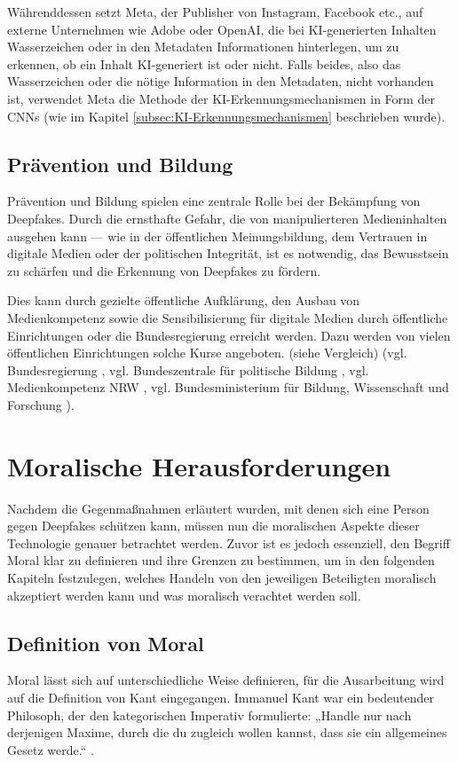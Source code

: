 \documentclass[a4paper,12pt]{article}
\begin{document}
Währenddessen setzt Meta, der Publisher von Instagram, Facebook etc., auf externe Unternehmen wie Adobe oder OpenAI, 
die bei KI-generierten Inhalten Wasserzeichen oder in den Metadaten Informationen hinterlegen, um zu erkennen, 
ob ein Inhalt KI-generiert ist oder nicht. Falls beides, also das Wasserzeichen oder die nötige Information in den Metadaten, nicht vorhanden ist, 
verwendet Meta die Methode der KI-Erkennungsmechanismen in Form der CNNs (wie im Kapitel \ref{subsec:KI-Erkennungsmechanismen} beschrieben wurde). \cite{TheVerge2024b} \cite{Meta2024}

\subsection{Prävention und Bildung}
Prävention und Bildung spielen eine zentrale Rolle bei der Bekämpfung von Deepfakes. 
Durch die ernsthafte Gefahr, die von manipulierteren Medieninhalten ausgehen kann — wie in der öffentlichen Meinungsbildung, 
dem Vertrauen in digitale Medien oder der politischen Integrität, ist es notwendig, 
das Bewusstsein zu schärfen und die Erkennung von Deepfakes zu fördern.  

Dies kann durch gezielte öffentliche Aufklärung, den Ausbau von Medienkompetenz sowie die Sensibilisierung für digitale Medien durch öffentliche Einrichtungen oder die Bundesregierung erreicht werden. 
Dazu werden von vielen öffentlichen Einrichtungen solche Kurse angeboten. (siehe Vergleich)
 (vgl. Bundesregierung \cite{Bundesregierung2024}, vgl. Bundeszentrale für politische Bildung \cite{BPB2024}, 
 vgl. Medienkompetenz NRW \cite{Medienkompetenz2024}, vgl. Bundesministerium für Bildung, Wissenschaft und Forschung \cite{Erwachsenenbildung2024}).

\newpage

\section{Moralische Herausforderungen}
Nachdem die Gegenmaßnahmen erläutert wurden, mit denen sich eine Person gegen Deepfakes schützen kann, 
müssen nun die moralischen Aspekte dieser Technologie genauer betrachtet werden. 
Zuvor ist es jedoch essenziell, den Begriff Moral klar zu definieren und ihre Grenzen zu bestimmen, 
um in den folgenden Kapiteln festzulegen, welches Handeln von den jeweiligen Beteiligten moralisch akzeptiert werden kann und was moralisch verachtet werden soll.

\subsection{Definition von Moral}
Moral lässt sich auf unterschiedliche Weise definieren, für die Ausarbeitung wird auf die Definition von Kant eingegangen. 
Immanuel Kant war ein bedeutender Philosoph, der den kategorischen Imperativ formulierte: „Handle nur nach derjenigen Maxime, durch die du zugleich wollen kannst, dass sie ein allgemeines Gesetz werde.“ \cite{KantMetaphysik}.
\end{document}
